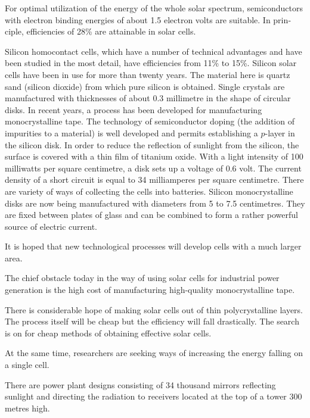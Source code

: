 For optimal utilization of the energy of the whole solar spectrum, semiconductors with electron binding en­ergies of about 1.5 electron volts are suitable. In prin­ciple, efficiencies of 28\% are attainable in solar cells.

Silicon homocontact cells, which have a number of technical advantages and have been studied in the most detail, have efficiencies from 11\% to 15\%. Silicon solar cells have been in use for more than twenty years. The material here is quartz sand (silicon dioxide) from which pure silicon is obtained. Single crystals are manufactured with thicknesses of about 0.3 millimetre in the shape of circular disks. In recent years, a process has been developed for manufacturing monocrystalline tape. The tech­nology of semiconductor doping (the addition of impu­rities to a material) is well developed and permits establishing a $p$-layer in the silicon disk. In order to reduce the reflection of sunlight from the silicon, the surface is covered with a thin film of titanium oxide. With a light intensity of 100 milliwatts per square centimetre, a disk sets up a voltage of 0.6 volt. The current density of a short circuit is equal to 34 milliamperes per square centimetre. There are variety of ways of collecting the cells into batteries. Silicon monocrystalline disks are now being manufactured with diameters from 5 to 7.5 centimetres. They are fixed between plates of glass and can be combined to form a rather powerful source of electric current.

It is hoped that new technological processes will de­velop cells with a much larger area.

The chief obstacle today in the way of using solar cells for industrial power generation is the high cost of manufacturing high-quality monocrystalline tape.

There is considerable hope of making solar cells out of thin polycrystalline layers. The process itself will be cheap but the efficiency will fall drastically. The search is on for cheap methods of obtaining effective solar cells.

At the same time, researchers are seeking ways of increasing the energy falling on a single cell.

There are power plant designs consisting of 34 thousand mirrors reflecting sunlight and directing the radiation to receivers located at the top of a tower 300 metres high.

